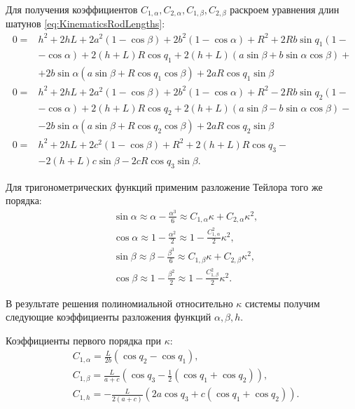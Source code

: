 Для получения коэффициентов $C_{1,\alpha},C_{2,\alpha},C_{1,\beta},C_{2,\beta}$ раскроем уравнения длин шатунов \ref{eq:KinematicsRodLengths}:
\begin{equation}
\label{eq:DirectKinematicsRodLengthsFull}
	\begin{aligned}
	0 = & h^2 + 2hL + 2a^2\left(1-\cos\beta\right) + 2b^2\left(1-\cos\alpha\right) + R^2 + 2Rb\sin{q_1}\left(1 - \right.\\
	&\left.-\cos\alpha\right) + 2\left(h+L\right)R\cos{q_1} + 2\left(h+L\right)\left(a\sin\beta + b\sin\alpha\cos\beta\right)+\\
	& + 2b\sin\alpha\left(a\sin\beta + R\cos{q_1}\cos\beta\right) + 2aR\cos{q_1}\sin\beta \\
	0 = & h^2 + 2hL + 2a^2\left(1-\cos\beta\right) + 2b^2\left(1-\cos\alpha\right) + R^2 - 2Rb\sin{q_2}\left(1 -\right.\\
	&\left. - \cos\alpha\right) + 2\left(h+L\right)R\cos{q_2} + 2\left(h+L\right)\left(a\sin\beta - b\sin\alpha\cos\beta\right)-\\
	& - 2b\sin\alpha\left(a\sin\beta + R\cos{q_2}\cos\beta\right) + 2aR\cos{q_2}\sin\beta\\
	0 = & h^2 + 2hL + 2c^2\left(1-\cos\beta\right) + R^2 + 2\left(h+L\right)R\cos{q_3}-\\
	& - 2\left(h+L\right)c\sin\beta - 2cR\cos{q_3}\sin\beta.
	\end{aligned}
\end{equation}

Для тригонометрических функций применим разложение Тейлора того же порядка:
\begin{equation}
\label{eq:DirectKinematicsSinCosSeries}
\begin{aligned}
	& \sin\alpha \approx \alpha-\frac{\alpha^3}{6} \approx C_{1,\alpha}\kappa + C_{2,\alpha}\kappa^2,\\
	& \cos\alpha \approx 1 - \frac{\alpha^2}{2} \approx 1 - \frac{C^2_{1,\alpha}}{2}\kappa^2,\\
	& \sin\beta \approx \beta-\frac{\beta^3}{6} \approx C_{1,\beta}\kappa + C_{2,\beta}\kappa^2,\\
	& \cos\beta \approx 1 - \frac{\beta^2}{2} \approx 1 - \frac{C^2_{1,\beta}}{2}\kappa^2.
\end{aligned}
\end{equation}

В результате решения полиномиальной относительно $\kappa$ системы получим следующие коэффициенты разложения функций $\alpha,\beta,h$.

Коэффициенты первого порядка при $\kappa$:
\begin{equation}
\label{eq:DirectKinematicsCoefsApprox1}
\begin{aligned}
	& C_{1,\alpha} = \frac{L}{2b}\left(\cos{q_2} - \cos{q_1}\right),\\
	& C_{1,\beta} = \frac{L}{a+c}\left(\cos{q_3} - \frac{1}{2}\left(\cos{q_1} + \cos{q_2}\right)\right),\\
	& C_{1,h} = -\frac{L}{2\left(a+c\right)}\left(2a\cos{q_3} + c\left(\cos{q_1} + \cos{q_2}\right)\right).
\end{aligned}
\end{equation}

